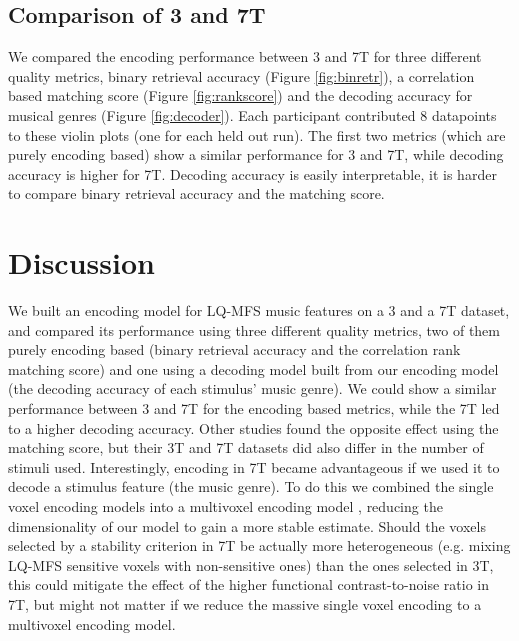 \subsection*{Comparison of 3 and 7T}
%
%
We compared the encoding performance between 3 and 7T for three different
quality metrics, binary retrieval accuracy (Figure \ref{fig:binretr}), a
correlation based matching score (Figure \ref{fig:rankscore}) and the decoding
accuracy for musical genres (Figure \ref{fig:decoder}). Each participant
contributed 8 datapoints to these violin plots (one for each held out run). The
first two metrics (which are purely encoding based) show a similar performance
for 3 and 7T, while decoding accuracy is higher for 7T. Decoding accuracy is
easily interpretable, it is harder to compare binary retrieval accuracy and the
matching score.     


\section*{Discussion}

We built an encoding model for LQ-MFS music features on a 3 and a 7T dataset,
and compared its performance using three different quality metrics, two of them
purely encoding based (binary retrieval accuracy and the correlation rank
matching score) and one using a decoding model built from our encoding model
(the decoding accuracy of each stimulus' music genre). We could show a similar
performance between 3 and 7T for the encoding based metrics, while the 7T led
to a higher decoding accuracy. Other studies \citep[e.g.,][]{SF14} found the opposite
effect using the matching score, but their 3T and 7T datasets did also differ
in the number of stimuli used. Interestingly, encoding in 7T became
advantageous if we used it to decode a stimulus feature (the music genre). To
do this we combined the single voxel encoding models into a multivoxel encoding
model \citep[see][]{NG09}, reducing the dimensionality of our model to gain a
more stable estimate. Should the voxels selected by a stability criterion in 7T
be actually more heterogeneous (e.g. mixing LQ-MFS sensitive voxels with
non-sensitive ones) than the ones selected in 3T, this could mitigate the
effect of the higher functional contrast-to-noise ratio in 7T, but might not
matter if we reduce the massive single voxel encoding to a multivoxel encoding
model.

